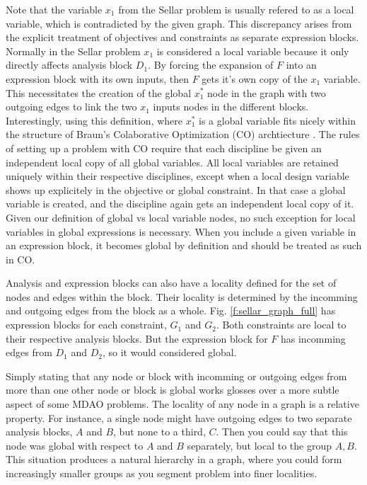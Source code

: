   Note that the variable $x_1$ from the Sellar problem is usually refered to as 
  a local variable, which is contradicted by the given graph. This discrepancy 
  arises from the explicit treatment of objectives and constraints as separate 
  expression blocks. Normally in the Sellar problem $x_1$ is considered a local 
  variable because it only directly affects analysis block $D_1$. By forcing
  the expansion of $F$ into an expression block with its own inputs, then $F$ 
  gets it's own copy of the $x_1$ variable. This necessitates the creation 
  of the global $x_1^*$ node in the graph with two outgoing edges to link the 
  two $x_1$ inputs nodes in the different blocks. Interestingly, using this 
  definition, where $x_1^*$ is a global variable fits nicely within 
  the structure of Braun's Colaborative Optimization (CO) archtiecture \cite{braun1996thesis}. 
  The rules of setting up a problem with CO require that each discipline be 
  given an independent local copy of all global variables. All local 
  variables are retained uniquely within their respective disciplines, except 
  when a local design variable shows up explicitely in the objective 
  or global constraint. In that case a global variable is created, and the discipline again 
  gets an independent local copy of it. Given our definition of global vs local
  variable nodes, no such exception for local variables in global expressions is 
  necessary. When you include a given variable in an expression block, it becomes 
  global by definition and should be treated as such in CO. 

  Analysis and expression blocks can also have a locality defined for the set of 
  nodes and edges within the block. Their locality is determined by the 
  incomming and outgoing edges from the block as a whole. Fig. 
  \ref{f:sellar_graph_full} has expression blocks for each constraint, 
  $G_1$ and $G_2$. Both constraints are local to their respective analysis 
  blocks. But the expression block for $F$ has incomming edges from $D_1$ and 
  $D_2$, so it would considered global. 

  Simply stating that any node or block with incomming or outgoing edges
  from more than one other node or block is global works glosses over a more 
  subtle aspect of some MDAO problems. The locality of any node in a graph is 
  a relative property. For instance, a single node might have outgoing edges 
  to two separate analysis blocks, $A$ and $B$, but none to a third, $C$. Then 
  you could say that this node was global with respect to $A$ and $B$ separately, but local 
  to the group $A,B$. This situation produces a natural 
  hierarchy in a graph, where you could form increasingly smaller groups as you 
  segment problem into finer localities. 

